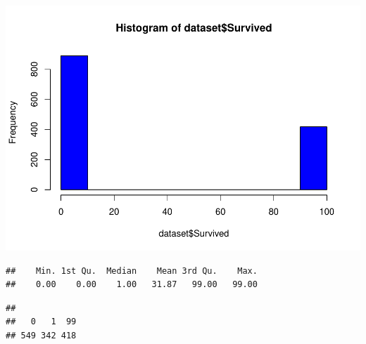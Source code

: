\documentclass[
]{article}
\newenvironment{Shaded}{\begin{snugshade}}{\end{snugshade}}
\newcommand{\AttributeTok}[1]{\textcolor[rgb]{0.80,0.80,0.80}{#1}}
\newcommand{\CommentTok}[1]{\textcolor[rgb]{0.50,0.62,0.50}{#1}}
\newcommand{\FunctionTok}[1]{\textcolor[rgb]{0.94,0.94,0.56}{#1}}
\newcommand{\NormalTok}[1]{\textcolor[rgb]{0.80,0.80,0.80}{#1}}
\newcommand{\SpecialCharTok}[1]{\textcolor[rgb]{0.86,0.64,0.64}{#1}}
\newcommand{\StringTok}[1]{\textcolor[rgb]{0.80,0.58,0.58}{#1}}
\begin{document}
\includegraphics{titanic-analysis_files/figure-latex/unnamed-chunk-14-1.pdf}

\begin{Shaded}
\end{Shaded}

\begin{verbatim}
##    Min. 1st Qu.  Median    Mean 3rd Qu.    Max. 
##    0.00    0.00    1.00   31.87   99.00   99.00
\end{verbatim}

\begin{Shaded}
\end{Shaded}

\begin{verbatim}
## 
##   0   1  99 
## 549 342 418
\end{verbatim}

\begin{Shaded}
\end{Shaded}
\end{document}
